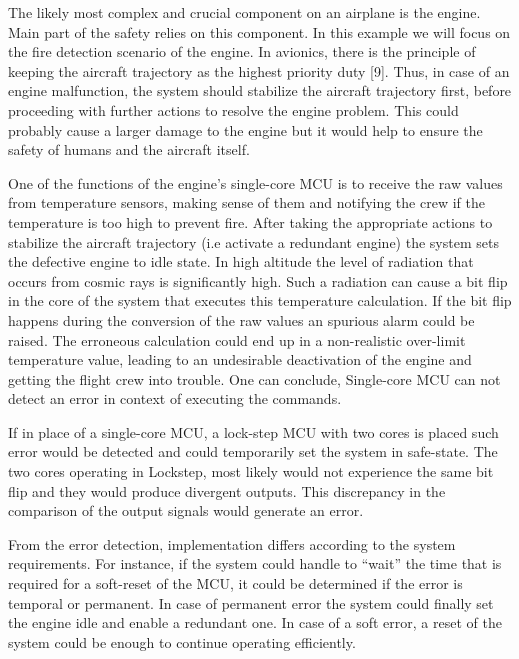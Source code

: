 The likely most complex and crucial component on an airplane is the engine. Main part of the safety relies on this component. In this example we will focus on the fire detection scenario of the engine. 
In avionics, there is the principle of keeping the aircraft trajectory as
the highest priority duty [9]. Thus, in case of an engine malfunction, the system
should stabilize the aircraft trajectory first, before proceeding with further actions
to resolve the engine problem. This could probably cause a larger damage to the
engine but it would help to ensure the safety of humans and the aircraft itself.

One of the functions of the engine's single-core MCU is to receive the raw values from temperature sensors, making sense of them and notifying the crew if the temperature is too high to prevent fire.  
After taking the appropriate actions to stabilize the aircraft trajectory (i.e activate a redundant engine) the system sets the defective engine to idle state. In high
altitude the level of radiation that occurs from cosmic rays is significantly high.
Such a radiation can cause a bit flip in the core of the
system that executes this temperature calculation. If the bit flip happens during the conversion of the raw values an spurious alarm could be raised. The erroneous calculation could end up in a non-realistic
over-limit temperature value, leading to an undesirable deactivation of the engine
and getting the flight crew into trouble. One can conclude, Single-core MCU can not detect an error in context of executing the commands.

If in place of a single-core MCU, a lock-step MCU with two cores is placed such error would be detected and could temporarily set the system in safe-state. The
two cores operating in Lockstep, most likely would not experience the same bit flip
and they would produce divergent outputs. This discrepancy in the comparison of
the output signals would generate an error.


From the error detection, implementation differs according to the system requirements. For instance, if the system could handle to “wait” the time that is required for a
soft-reset of the MCU, it could be determined if the error is temporal or permanent.
In case of permanent error the system could finally set the engine idle and enable
a redundant one. In case of a soft error, a reset of the system could be enough to
continue operating efficiently.

